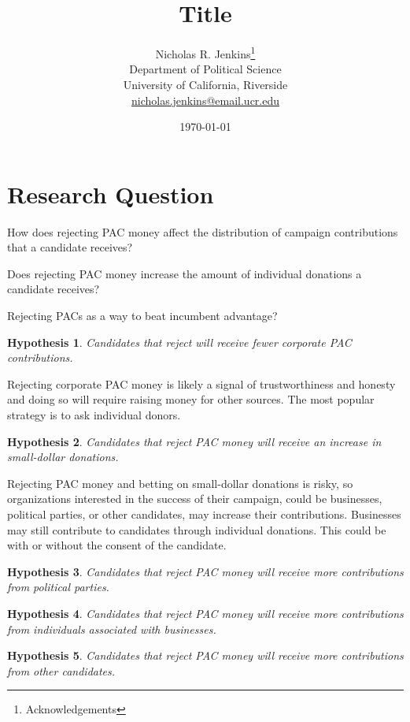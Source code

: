 \documentclass[12pt]{article}
\title{\textbf{Title}}
\author{Nicholas R. Jenkins\thanks{Acknowledgements} \\ Department of Political Science\\ University of California, Riverside\\ \href{mailto:nicholas.jenkins@email.ucr.edu}{nicholas.jenkins@email.ucr.edu}}
\date{\today}
\makeatletter
\newtheorem{hyp}{Hypothesis}
\newcounter{subhyp}
\newenvironment{subhyp}
 {%
  \setcounter{subhyp}{0}%
  \stepcounter{hyp}%
  \edef\saved@hyp{\thehyp}%
  \let\c@hyp\c@subhyp     %
  \renewcommand{\thehyp}{\saved@hyp\alph{hyp}}%
 }
 {}
\makeatother
\begin{document}
\maketitle
\thispagestyle{empty}

\pagebreak

\cleardoublepage
\setcounter{page}{1}

\doublespacing

\section{Research Question}

How does rejecting PAC money affect the distribution of campaign contributions that a candidate receives?

Does rejecting PAC money increase the amount of individual donations a candidate receives?

Rejecting PACs as a way to beat incumbent advantage?

\begin{hyp}
	Candidates that reject will receive fewer corporate PAC contributions.
\end{hyp}

Rejecting corporate PAC money is likely a signal of trustworthiness and honesty and doing so will require raising money for other sources. The most popular strategy is to ask individual donors.

\begin{hyp}
	Candidates that reject PAC money will receive an increase in small-dollar donations. 
\end{hyp} 

Rejecting PAC money and betting on small-dollar donations is risky, so organizations interested in the success of their campaign, could be businesses, political parties, or other candidates, may increase their contributions. Businesses may still contribute to candidates through individual donations. This could be with or without the consent of the candidate.

\begin{subhyp}
	\begin{hyp}
		Candidates that reject PAC money will receive more contributions from political parties.
	\end{hyp}
	
	\begin{hyp}
		Candidates that reject PAC money will receive more contributions from individuals associated with businesses.
	\end{hyp}
	
	\begin{hyp}
		Candidates that reject PAC money will receive more contributions from other candidates.
	\end{hyp}
\end{subhyp}
\end{document}
